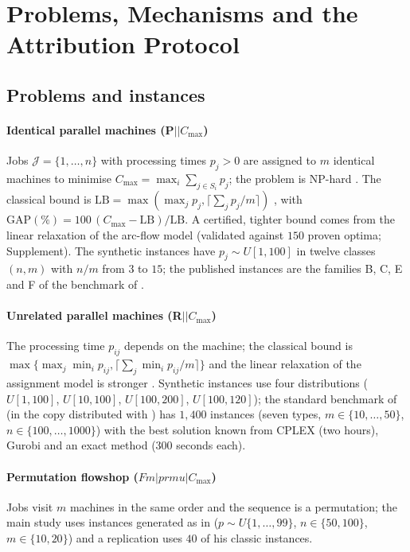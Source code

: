 \section{Problems, Mechanisms and the Attribution Protocol}
\label{sec:problem}

\subsection{Problems and instances}

\paragraph{Identical parallel machines (P$||C_{\max}$)}
Jobs $\mathcal J=\{1,\ldots,n\}$ with processing times $p_j>0$ are assigned to $m$ identical machines to minimise $C_{\max}=\max_i\sum_{j\in S_i}p_j$; the problem is NP-hard
\citep{GareyJohnson1979}. The classical bound is $\mathrm{LB}=\max(\max_jp_j,\lceil\sum_jp_j/m\rceil)$ \citep{Graham1969}, with $\mathrm{GAP}(\%)=100\,(C_{\max}-\mathrm{LB})/\mathrm{LB}$.
A certified, tighter bound comes from the linear relaxation of the arc-flow model \citep{MradSouayah2018,GharbiBamatraf2022} (validated against $150$ proven optima; Supplement). The
synthetic instances have $p_j\sim U[1,100]$ in twelve classes $(n,m)$ with $n/m$ from $3$ to $15$; the published instances are the families B, C, E and F of the benchmark of
\citet{OstojicEtAl2025}.

\paragraph{Unrelated parallel machines (R$||C_{\max}$)}
The processing time $p_{ij}$ depends on the machine; the classical bound is $\max\{\max_j\min_ip_{ij},\lceil\sum_j\min_ip_{ij}/m\rceil\}$ and the linear relaxation of the assignment model is
stronger \citep{LenstraEtal1990}. Synthetic instances use four distributions ($U[1,100]$, $U[10,100]$, $U[100,200]$, $U[100,120]$); the standard benchmark of \citet{FanjulPeyroRuiz2010}
(in the copy distributed with \citealt{AbladEtAl2021}) has $1{,}400$ instances (seven types, $m\in\{10,\ldots,50\}$, $n\in\{100,\ldots,1000\}$) with the best solution known from CPLEX
(two hours), Gurobi and an exact method (300 seconds each).

\paragraph{Permutation flowshop ($Fm|prmu|C_{\max}$)}
Jobs visit $m$ machines in the same order and the sequence is a permutation; the main study uses instances generated as in \citet{Taillard1993} ($p\sim U\{1,\ldots,99\}$, $n\in\{50,100\}$, $m\in\{10,20\}$) and a replication uses $40$ of his classic instances.

